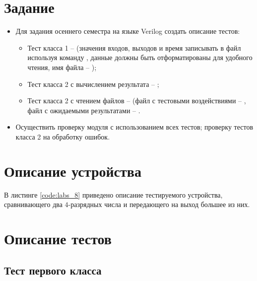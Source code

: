 





\tableofcontents
\lstlistoflistings
\listoffigures
\newpage

\section{Задание}

\begin{itemize}
	\item Для задания  осеннего семестра на языке Verilog создать описание тестов:
		\begin{itemize}
			\item Тест класса 1 --  (значения входов, выходов и время записывать в файл используя команду , данные должны быть отформатированы для удобного чтения, имя файла -- );
			\item Тест класса 2 с вычислением результата -- ;
			\item Тест класса 2 с чтением файлов --  (файл с тестовыми воздействиями -- , файл с ожидаемыми результатами -- .
		\end{itemize}

	\item Осуществить проверку модуля с использованием всех тестов; проверку тестов класса 2 на обработку ошибок.
\end{itemize}

\section{Описание устройства}

В листинге \ref{code:labs_8} приведено описание тестируемого устройства, сравнивающего два $4$-разрядных числа и передающего на выход большее из них.


\newpage

\section{Описание тестов}
\label{sec:tests}

\subsection{Тест первого класса}

